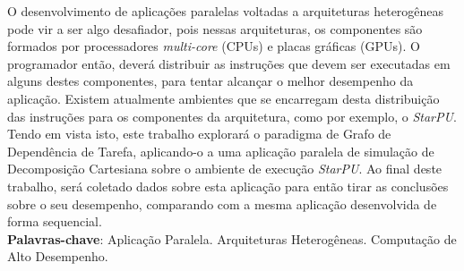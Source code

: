 
\begin{resumo}[RESUMO]
\begin{SingleSpacing}


O desenvolvimento de aplicações paralelas voltadas a arquiteturas heterogêneas pode vir a ser algo desafiador, pois nessas arquiteturas, os componentes são formados por processadores \emph{multi-core} (CPUs) e placas gráficas (GPUs).
O programador então, deverá distribuir as instruções que devem ser executadas em alguns destes componentes, para tentar alcançar o melhor desempenho da aplicação.
Existem atualmente ambientes que se encarregam desta distribuição das instruções para os componentes da arquitetura, como por exemplo, o \emph{StarPU}. 
Tendo em vista isto, este trabalho explorará o paradigma de Grafo de Dependência de Tarefa, aplicando-o a uma aplicação paralela de simulação de Decomposição Cartesiana sobre o ambiente de execução \emph{StarPU}.
Ao final deste trabalho, será coletado dados sobre esta aplicação para então tirar as conclusões sobre o seu desempenho, comparando com a mesma aplicação desenvolvida de forma sequencial.\\

\textbf{Palavras-chave}: Aplicação Paralela. Arquiteturas Heterogêneas. Computação de Alto Desempenho.

\end{SingleSpacing}
\end{resumo}

